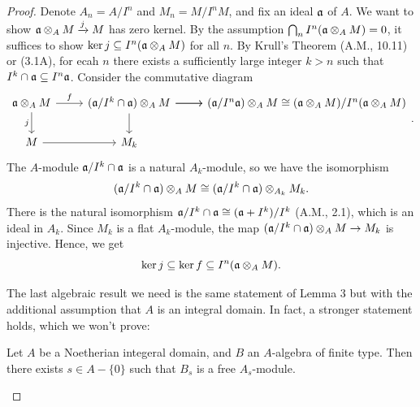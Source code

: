 \documentclass[a4paper]{article}
\begin{document}
\begin{enumerate} [label=\textbf{\arabic*.}, leftmargin=0em]
\begin{proof}
          Denote $A_n = A / I^n$ and $M_n = M / I^n M$, and fix an ideal $\mathfrak{a}$ of $A$.
          We want to show $\mathfrak{a} \otimes_A M \xrightarrow{j} M$ has zero kernel.
          By the assumption $\bigcap_n I^n(\mathfrak{a} \otimes_A M) = 0$, it suffices to show $\ker{j} \subseteq I^n(\mathfrak{a} \otimes_A M)$ for all $n$.
          By Krull's Theorem (A.M., 10.11) or (3.1A), for ecah $n$ there exists a sufficiently large integer $k > n$ such that $I^k \cap \mathfrak{a} \subseteq I^n \mathfrak{a}$.
          Consider the commutative diagram
          \[ \begin{tikzcd}
              \goth{a} \otimes_A M \arrow[r, "f"] \arrow[d, "j"'] & (\goth{a} / I^k \cap \goth{a}) \otimes_A M \arrow[r] \arrow[r] \arrow[d] & (\goth{a}/I^n \goth{a}) \otimes_A M \cong (\goth{a} \otimes_A M) / I^n(\goth{a} \otimes_A M) \\
              M \arrow[r]                                         & M_k                                                                      &                         \end{tikzcd}. \]
          The $A$-module $\mathfrak{a} / I^k \cap \mathfrak{a}$ is a natural $A_k$-module, so we have the isomorphism
          \begin{equation*}
            (\mathfrak{a} / I^k \cap \mathfrak{a}) \otimes_A M \cong (\mathfrak{a} / I^k \cap \mathfrak{a}) \otimes_{A_k} M_k.
          \end{equation*}
          There is the natural isomorphism $\mathfrak{a} / I^k \cap \mathfrak{a} \cong (\mathfrak{a} + I^k) / I^k$ (A.M., 2.1), which is an ideal in $A_k$.
          Since $M_k$ is a flat $A_k$-module, the map $(\mathfrak{a} / I^k \cap \mathfrak{a}) \otimes_A M \to M_k$ is injective.
          Hence, we get
          \begin{equation*}
            \ker{j} \subseteq \ker{f} \subseteq I^n(\mathfrak{a} \otimes_A M).
          \end{equation*}

          The last algebraic result we need is the same statement of Lemma 3 but with the additional assumption that $A$ is an integral domain.
          In fact, a stronger statement holds, which we won't prove:
          \begin{lemma} [Nitsure, 5.11]
            Let $A$ be a Noetherian integeral domain, and $B$ an $A$-algebra of finite type.
            Then there exists $s \in A - \{ 0 \}$ such that $B_s$ is a free $A_s$-module.
          \end{lemma}


\end{proof}
\end{enumerate}
\end{document}
